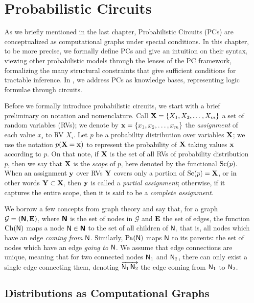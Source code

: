 \chapter{Probabilistic Circuits}
\label{ch:pc}

As we briefly mentioned in the last chapter, Probabilistic Circuits (PCs) are conceptualized as
computational graphs under special conditions. In this chapter,  to be more precise,
we formally define PCs and give an intuition on their syntax, viewing other probabilistic models
through the lenses of the PC framework, formalizing the many structural constraints that give
sufficient conditions for tractable inference. In , we address PCs as knowledge
bases, representing logic formulae through circuits.

Before we formally introduce probabilistic circuits, we start with a brief preliminary on notation
and nomenclature. Call $\mathbf{X}=\{X_1,X_2,\ldots,X_m\}$ a set of random variables (RVs); we denote
by $\mathbf{x}=\{x_1,x_2,\ldots,x_m\}$ the \emph{assignment} of each value $x_i$ to RV $X_i$. Let $p$
be a probability distribution over variables $\mathbf{X}$; we use the notation $p(\mathbf{X}=\mathbf{x})$ to
represent the probability of $\mathbf{X}$ taking values $\mathbf{x}$ according to $p$. On that note, if
$\mathbf{X}$ is the set of all RVs of probability distribution $p$, then we say that $\mathbf{X}$ is the
\emph{scope} of $p$, here denoted by the functional $\operatorname*{\normalfont{Sc}}(p)$. When an assignment $\mathbf{y}$ over RVs
$\mathbf{Y}$ covers only a portion of $\operatorname*{\normalfont{Sc}}(p)=\mathbf{X}$, or in other words $\mathbf{Y}\subset\mathbf{X}$,
then $\mathbf{y}$ is called a \emph{partial assignment}; otherwise, if it captures the entire scope,
then it is said to be a \emph{complete assignment}.

We borrow a few concepts from graph theory and say that, for a graph
$\mathcal{G}=(\operatorname{\textup{\textsf{\textbf{N}}}},\mathbf{E})$, where $\operatorname{\textup{\textsf{\textbf{N}}}}$ is the set of nodes in $\mathcal{G}$ and $\mathbf{E}$
the set of edges, the function $\operatorname*{\normalfont{Ch}}(\operatorname{\textup{\textsf{N}}})$ maps a node $\operatorname{\textup{\textsf{N}}}\in\operatorname{\textup{\textsf{\textbf{N}}}}$ to the set of all children
of $\operatorname{\textup{\textsf{N}}}$, that is, all nodes which have an edge \emph{coming from} $\operatorname{\textup{\textsf{N}}}$. Similarly,
$\operatorname*{\normalfont{Pa}}(\operatorname{\textup{\textsf{N}}})$ maps $\operatorname{\textup{\textsf{N}}}$ to its parents: the set of nodes which have an edge \emph{going to}
$\operatorname{\textup{\textsf{N}}}$. We assume that edge connections are unique, meaning that for two connected nodes $\operatorname{\textup{\textsf{N}}}_1$
and $\operatorname{\textup{\textsf{N}}}_2$, there can only exist a single edge connecting them, denoting
$\overrightarrow{\operatorname{\textup{\textsf{N}}}_1\operatorname{\textup{\textsf{N}}}_2}$ the edge coming from $\operatorname{\textup{\textsf{N}}}_1$ to $\operatorname{\textup{\textsf{N}}}_2$.

\section{Distributions as Computational Graphs}
\label{sec:pc}

